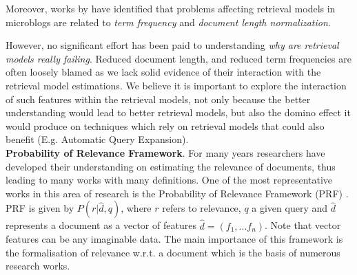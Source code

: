 Moreover, works by \cite{ferguson2012investigation,naveed2011searching} have identified that problems affecting retrieval models in microblogs are related to \textit{term frequency} and \textit{document length normalization}.

However, no significant effort has been paid to understanding \textit{why are retrieval models really failing}. Reduced document length, and reduced term frequencies are often loosely blamed as we lack solid evidence of their interaction with the retrieval model estimations. We believe it is important to explore the interaction of such features within the retrieval models, not only because the better understanding would lead to better retrieval models, but also the domino effect it would produce on techniques which rely on retrieval models that could also benefit (E.g. Automatic Query Expansion).\\

\noindent \textbf{Probability of Relevance Framework}. For many years researchers have developed their understanding on estimating the relevance of documents, thus leading to many works with many definitions. One of the most representative works in this area of research is the Probability of Relevance Framework (PRF) \cite{roelleke2013information}. PRF is given by \(P(r|\hat{d},q)\), where \(r\) refers to relevance, \(q\) a given query and \(\hat{d}\) represents a document as a vector of features \(\hat{d} = (f_1,...f_n)\). Note that vector features can be any imaginable data. The main importance of this framework is the formalisation of relevance w.r.t. a document which is the basis of numerous research works.\\

